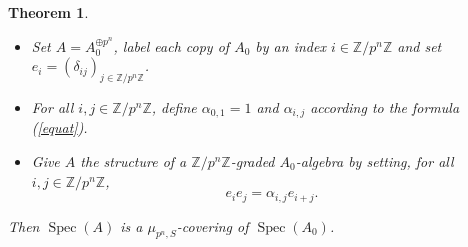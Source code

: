 \documentclass{amsart}
\newtheorem{theo}{Theorem}[section]
\theoremstyle{definition}
\theoremstyle{remark}
\begin{document}
\begin{theo}
\begin{itemize}

\item Set $A = A_0^{\oplus p^n}$, label each copy of $A_0$ by an index $i \in {\mathbb{Z}} / p^n {\mathbb{Z}}$ and set $e_i = (\delta_{ij})_{j \in {\mathbb{Z}} / p^n {\mathbb{Z}}}$.

\item For all $i,j \in {\mathbb{Z}}/ p^n {\mathbb{Z}}$, define $\alpha_{0,1}=1$ and $\alpha_{i,j}$ according to the formula (\ref{equat}).

\item Give $A$ the structure of a ${\mathbb{Z}} / p^n {\mathbb{Z}}$-graded $A_0$-algebra by setting, for all $i,j \in {\mathbb{Z}} / p^n {\mathbb{Z}}$, \[e_ie_j = \alpha_{i,j} e_{i+j}. \]

\end{itemize}

Then $\operatorname{Spec}(A)$ is a $\mu_{p^n,S}$-covering of $\operatorname{Spec}(A_0)$.

\end{theo}
\end{document}

